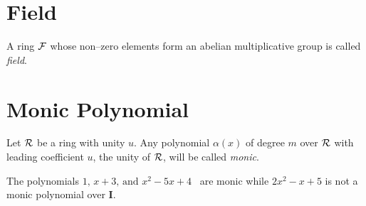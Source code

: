 \documentclass[a4paper,11pt]{article} %
\theoremstyle{plain} %
{\theorembodyfont{\normalfont}
\newtheorem{Exa}{Example}}
\newcommand{\matr}[1]{\mathbf{#1}}
\begin{document}
\section{Field}
A ring $\cal F$ whose non--zero elements form an abelian
multiplicative group is called {\em field}. \cite[p.118]{algebra1}

\section{Monic Polynomial}
Let $\cal R$ be a ring with unity $u$. Any polynomial $\alpha(x)$ of degree $m$ over $\cal R$ with leading coefficient $u$, the unity of $\cal R$, will be called {\em monic}.\cite[p.126]{algebra1}
\begin{Exa}
 The polynomials $1,\, x+3 ,\, \text{and~} x^2-5x+4$ ~are monic while $2x^2-x+5$ is not a monic polynomial over $\matr{I}$.
\end{Exa}

\vspace{3\baselineskip}




\label{lastpage}%
\end{document}
